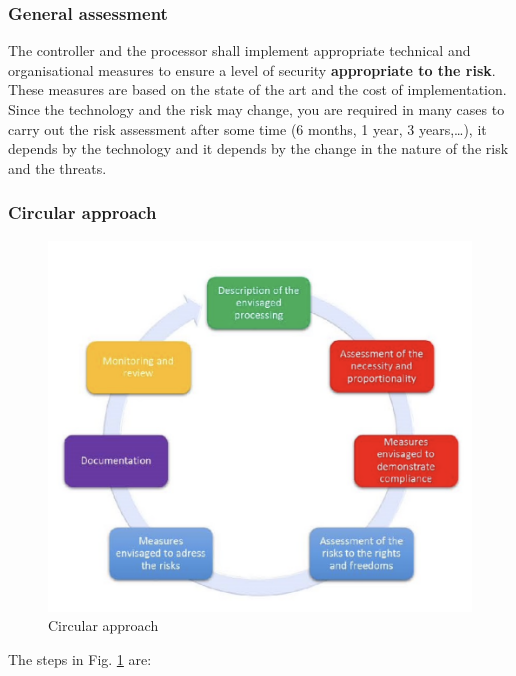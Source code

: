 \subsubsection{General assessment}
\label{sect:general_assess}
The controller and the processor shall implement appropriate technical and organisational measures to ensure a level of security \textbf{appropriate to the risk}. These measures are based on the state of the art and the cost of implementation. Since the technology and the risk may change, you are required in many cases to carry out the risk assessment after some time (6 months, 1 year, 3 years,…), it depends by the technology and it depends by the change in the nature of the risk and the threats.
\subsubsection{Circular approach}
\begin{figure}[!h]
    \centering
    \includegraphics[scale=0.6]{Images/Circular Approach.jpg}
    \caption{Circular approach}
    \label{fig:circular_approach}
\end{figure}
The steps in Fig. \ref{fig:circular_approach} are:
